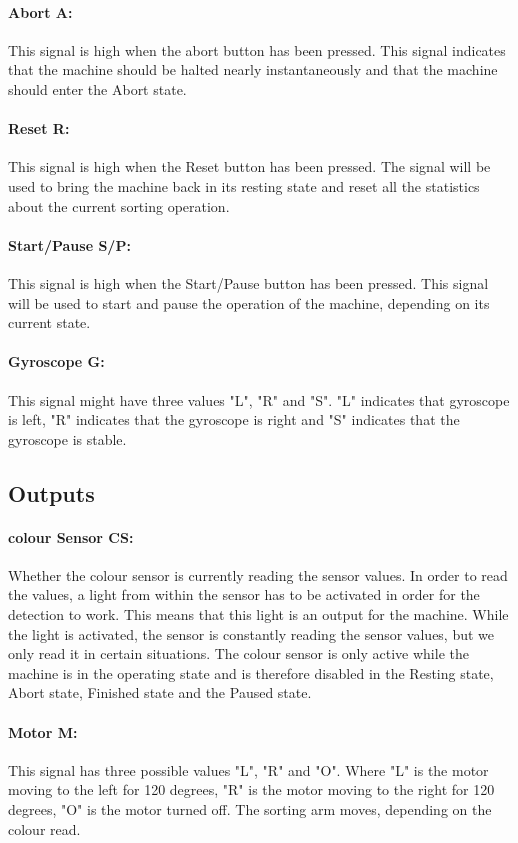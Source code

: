 \documentclass[a4paper,oneside,11pt]{article}
\begin{document}
\paragraph{Abort A:} This signal is high when the abort button has been pressed. This signal indicates that the machine should be halted nearly instantaneously and that the machine should enter the Abort state.
\paragraph{Reset R:} This signal is high when the Reset button has been pressed. The signal will be used to bring the machine back in its resting state and reset all the statistics about the current sorting operation.
\paragraph{Start/Pause S/P:} This signal is high when the Start/Pause button has been pressed. This signal will be used to start and pause the operation of the machine, depending on its current state.
\paragraph{Gyroscope G:} This signal might have three values "L", "R" and "S". "L" indicates that gyroscope is left, "R" indicates that the gyroscope is right and "S" indicates that the gyroscope is stable.

\subsection{Outputs}
\paragraph{colour Sensor CS:} Whether the colour sensor is currently reading the sensor values. In order to read the values, a light from within the sensor has to be activated in order for the detection to work. This means that this light is an output for the machine. While the light is activated, the sensor is constantly reading the sensor values, but we only read it in certain situations. The colour sensor is only active while the machine is in the operating state and is therefore disabled in the Resting state, Abort state, Finished state and the Paused state.
\paragraph{Motor M:} This signal has three possible values "L", "R" and "O". Where "L" is the motor moving to the left for 120 degrees, "R" is the motor moving to the right for 120 degrees, "O" is the motor turned off. The sorting arm moves, depending on the colour read.
\end{document}
